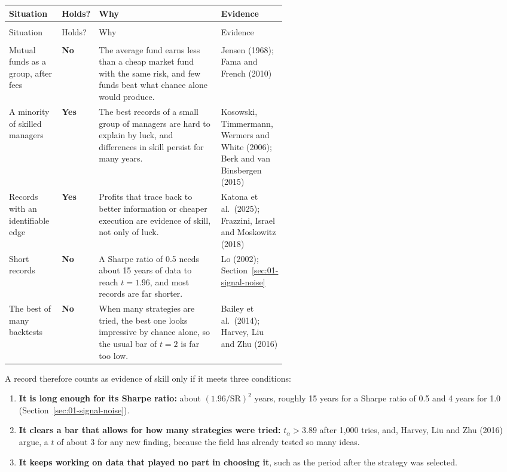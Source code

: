 \begingroup
\small
\setlength{\LTpre}{6pt}\setlength{\LTpost}{6pt}
\begin{longtable}{@{}>{\raggedright\arraybackslash}p{0.19\linewidth}>{\raggedright\arraybackslash}p{0.13\linewidth}>{\raggedright\arraybackslash}p{}>{\raggedright\arraybackslash}p{0.22\linewidth}@{}}
\toprule
Situation & Holds? & Why & Evidence \\
\midrule
\endfirsthead
\multicolumn{4}{@{}l}{\emph{(continued)}} \\
\toprule
Situation & Holds? & Why & Evidence \\
\midrule
\endhead
\midrule
\multicolumn{4}{r@{}}{\emph{(continued on the next page)}} \\
\endfoot
\bottomrule
\endlastfoot
Mutual funds as a group, after fees & \textbf{No} & The average fund earns less than a cheap market fund with the same risk, and few funds beat what chance alone would produce. & Jensen (1968); Fama and French (2010) \\*
A minority of skilled managers & \textbf{Yes} & The best records of a small group of managers are hard to explain by luck, and differences in skill persist for many years. & Kosowski, Timmermann, Wermers and White (2006); Berk and van Binsbergen (2015) \\
Records with an identifiable edge & \textbf{Yes} & Profits that trace back to better information or cheaper execution are evidence of skill, not only of luck. & Katona et al.\ (2025); Frazzini, Israel and Moskowitz (2018) \\
Short records & \textbf{No} & A Sharpe ratio of 0.5 needs about 15 years of data to reach $t = 1.96$, and most records are far shorter. & Lo (2002); Section~\ref{sec:01-signal-noise} \\*
The best of many backtests & \textbf{No} & When many strategies are tried, the best one looks impressive by chance alone, so the usual bar of $t = 2$ is far too low. & Bailey et al.\ (2014); Harvey, Liu and Zhu (2016) \\
\end{longtable}
\addtocounter{table}{-1}%
\endgroup

A record therefore counts as evidence of skill only if it meets three conditions:

\begin{enumerate}
  \item \textbf{It is long enough for its Sharpe ratio:} about $(1.96/\mathrm{SR})^2$ years, roughly 15 years for a Sharpe ratio of 0.5 and 4 years for 1.0 (Section~\ref{sec:01-signal-noise}).
  \item \textbf{It clears a bar that allows for how many strategies were tried:} $t_\alpha > 3.89$ after 1,000 tries, and, Harvey, Liu and Zhu (2016) argue, a $t$ of about 3 for any new finding, because the field has already tested so many ideas.
  \item \textbf{It keeps working on data that played no part in choosing it}, such as the period after the strategy was selected.
\end{enumerate}

